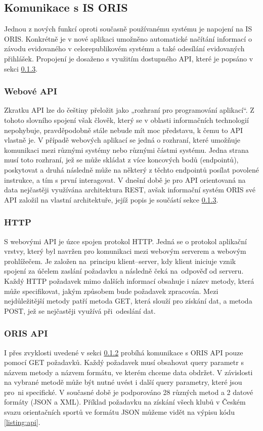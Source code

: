 \subsection{Komunikace s IS ORIS}
Jednou z nových funkcí oproti současně používanému systému je napojení na IS ORIS. Konkrétně je v nové aplikaci umožněno automatické načítání informací o závodu evidovaného v celorepublikovém systému a také odesílání evidovaných přihlášek. Propojení je dosaženo s využitím dostupného API, které je popsáno v sekci \ref{implementation:oris-api}.

\subsubsection{Webové API}\label{implementation:api}
Zkratku API lze do češtiny přeložit jako „rozhraní pro programování aplikací“. Z tohoto slovního spojení však člověk, který se v oblasti informačních technologií nepohybuje, pravděpodobně stále nebude mít moc představu, k čemu to API vlastně je. V případě webových aplikací se jedná o rozhraní, které umožňuje komunikaci mezi různými systémy nebo různými částmi systému. Jedna strana musí toto rozhraní, jež se může skládat z více koncových bodů (endpointů), poskytovat a druhá následně může na některý z těchto endpointů posílat povolené instrukce, a tím s první interagovat. V dnešní době je pro API orientovaná na data nejčastěji využívána architektura REST, avšak informační systém ORIS své API založil na vlastní architektuře, jejíž popis je součástí sekce \ref{implementation:oris-api}. \cite{api}

\subsubsection{HTTP}\label{http}
S webovými API je úzce spojen protokol HTTP. Jedná se o protokol aplikační vrstvy, který byl navržen pro komunikaci mezi webovým serverem a webovým prohlížečem. Je založen na~principu klient--server, kdy klient iniciuje vznik spojení za účelem zaslání požadavku a následně čeká na~odpověď od serveru. Každý HTTP požadavek mimo dalších informací obsahuje i název metody, která může specifikovat, jakým způsobem bude požadavek zpracován. Mezi nejdůležitější metody patří metoda GET, která slouží pro získání dat, a metoda POST, jež se nejčastěji využívá při~odeslání dat. \cite{http}

\subsubsection{ORIS API}\label{implementation:oris-api}
I přes zvyklosti uvedené v sekci \ref{http} probíhá komunikace s ORIS API pouze pomocí GET požadavků. Každý požadavek musí obsahovat query parametr s názvem metody a názvem formátu, ve kterém chceme data obdržet. V závislosti na vybrané metodě může být nutné uvést i další query parametry, které jsou pro~ni specifické. V současné době je podporováno 28 různých metod a 2 datové formáty (JSON a XML). Příklad požadavku na získání všech klubů v Českém svazu orientačních sportů ve formátu JSON můžeme vidět na výpisu kódu \ref{listing:api}. 

